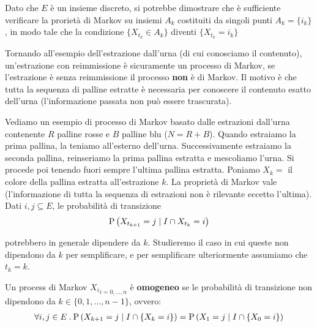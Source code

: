 \begin{note}
	Dato che $ E $ è un insieme discreto, si potrebbe dimostrare che è sufficiente verificare la prorietà di Markov su insiemi $ A_k $ costituiti da singoli punti $ A_k = \{i_k\} $, in modo tale che la condizione $ \{X_{t_k} \in A_k\} $ diventi $ \{X_{t_k} = i_k\} $
\end{note}

\begin{exmp}
	Tornando all'esempio dell'estrazione dall'urna (di cui conosciamo il contenuto), un'estrazione con reimmissione è sicuramente un processo di Markov, se l'estrazione è senza reimmissione il processo \textbf{non} è di Markov. Il motivo è che tutta la sequenza di palline estratte è necessaria per conoscere il contenuto esatto dell'urna (l'informazione passata non può essere trascurata).
\end{exmp}

\begin{exmp}
	Vediamo un esempio di processo di Markov basato dalle estrazioni dall'urna contenente $ R $ palline rosse e $ B $ palline blu ($ N = R+B $). Quando estraiamo la prima pallina, la teniamo all'esterno dell'urna. Successivamente estraiamo la seconda pallina, reinseriamo la prima pallina estratta e mescoliamo l'urna. Si procede poi tenendo fuori sempre l'ultima pallina estratta. Poniamo $ X_k = $ il colore della pallina estratta all'estrazione $ k $. La proprietà di Markov vale (l'informazione di tutta la sequenza di estrazioni non è rilevante eccetto l'ultima). Dati $ i,j \subseteq E $, le probabilità di transizione
	\begin{equation*}
		\text{P}\left(X_{t_{k+1}} = j \mid I \cap X_{t_k} = i\right)
	\end{equation*}
	
	potrebbero in generale dipendere da $ k $. Studieremo il caso in cui queste non dipendono da $ k $ per semplificare, e per semplificare ulteriormente assumiamo che $ t_k = k $.
\end{exmp}

\begin{defn}
	Un process di Markov $ {X_i}_{i=0,\hdots,n} $ è \textbf{omogeneo} se le probabilità di transizione non dipendono da $ k \in \{0, 1, \hdots, n-1\} $, ovvero:
	\begin{equation*}
	\begin{aligned}
		\forall i,j \in E \> . \> \text{P}\left(X_{k+1} = j \mid I \cap \{X_k = i\}\right) = \text{P}\left(X_1 = j \mid I \cap \{X_0 = i\}\right)
	\end{aligned}
	\end{equation*}
\end{defn}

